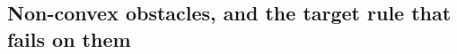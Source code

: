 \documentclass[11pt,a4paper]{article}
\begin{document}




\subsection{Non-convex obstacles, and the target rule that fails on them}
\label{sec:nonconvex}
\end{document}
